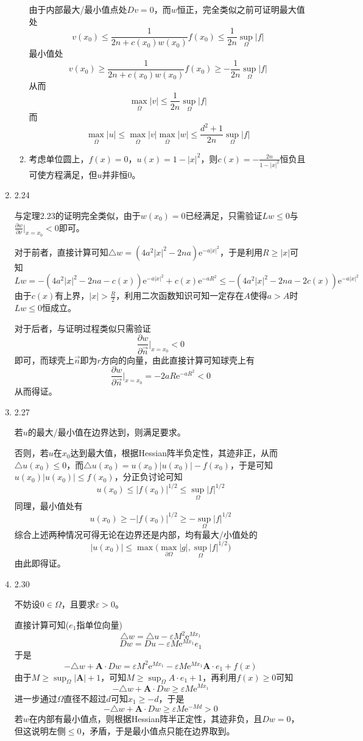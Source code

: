 \documentclass[a4paper,UTF8,fontset=windows,10pt]{ctexart}
\newcommand*{\er}{\mathrm{e}}
\begin{document}
\begin{enumerate}
\begin{enumerate}[(1)]
        由于内部最大/最小值点处$Dv=0$，而$w$恒正，完全类似之前可证明最大值处
        $$v(x_0)\le\frac{1}{2n+c(x_0)w(x_0)}f(x_0)\le\frac{1}{2n}\sup_\Omega|f|$$
        最小值处
        $$v(x_0)\ge\frac{1}{2n+c(x_0)w(x_0)}f(x_0)\ge-\frac{1}{2n}\sup_\Omega|f|$$
        从而
        $$\max_{\bar\Omega}|v|\le\frac{1}{2n}\sup_\Omega|f|$$
        而
        $$\max_{\bar\Omega}|u|\le\max_{\bar\Omega}|v|\max_{\bar\Omega}|w|\le\frac{d^2+1}{2n}\sup_\Omega|f|$$
    
        \item 考虑单位圆上，$f(x)=0$，$u(x)=1-|x|^2$，则$c(x)=-\frac{2n}{1-|x|^2}$恒负且可使方程满足，但$u$并非恒0。
    \end{enumerate}
    
    \item 2.24
    
    与定理2.23的证明完全类似，由于$w(x_0)=0$已经满足，只需验证$Lw\le0$与$\frac{\partial w}{\partial\nu}\big|_{x=x_0}<0$即可。
    
    对于前者，直接计算可知$\triangle w=(4a^2|x|^2-2na)\er^{-a|x|^2}$，于是利用$R\ge|x|$可知
    $$Lw=-(4a^2|x|^2-2na-c(x))\er^{-a|x|^2}+c(x)\er^{-aR^2}\le-(4a^2|x|^2-2na-2c(x))\er^{-a|x|^2}$$
    由于$c(x)$有上界，$|x|>\frac{R}{2}$，利用二次函数知识可知一定存在$A$使得$a>A$时$Lw\le0$恒成立。
    
    对于后者，与证明过程类似只需验证
    $$\frac{\partial w}{\partial\vec{n}}\bigg|_{x=x_0}<0$$
    即可，而球壳上$\vec{n}$即为$r$方向的向量，由此直接计算可知球壳上有
    $$\frac{\partial w}{\partial\vec{n}}\bigg|_{x=x_0}=-2aR\er^{-aR^2}<0$$
    从而得证。
    
    
    \item 2.27
    
    若$u$的最大/最小值在边界达到，则满足要求。
    
    否则，若$u$在$x_0$达到最大值，根据Hessian阵半负定性，其迹非正，从而$\triangle u(x_0)\le 0$，而$\triangle u(x_0)=u(x_0)|u(x_0)|-f(x_0)$，于是可知$u(x_0)|u(x_0)|\le f(x_0)$，分正负讨论可知
    $$u(x_0)\le|f(x_0)|^{1/2}\le\sup_\Omega|f|^{1/2}$$
    同理，最小值处有
    $$u(x_0)\ge-|f(x_0)|^{1/2}\ge-\sup_\Omega|f|^{1/2}$$
    综合上述两种情况可得无论在边界还是内部，均有最大/小值处的
    $$|u(x_0)|\le\max\bigg(\max_{\partial\Omega}|g|,\sup_\Omega|f|^{1/2}\bigg)$$
    由此即得证。
    
    \item 2.30
    
    不妨设$0\in\Omega$，且要求$\varepsilon>0$。
    
    直接计算可知($e_1$指单位向量)
    $$\triangle w=\triangle u-\varepsilon M^2\er^{Mx_1}$$
    $$Dw=Du-\varepsilon M\er^{Mx_1}e_1$$
    于是
    $$-\triangle w+\mathbf{A}\cdot Dw=\varepsilon M^2\er^{Mx_1}-\varepsilon M\er^{Mx_1}\mathbf{A}\cdot e_1+f(x)$$
    由于$M\ge\sup_\Omega|\mathbf{A}|+1$，可知$M\ge\sup_\Omega A\cdot e_1+1$，再利用$f(x)\ge0$可知
    $$-\triangle w+\mathbf{A}\cdot Dw\ge\varepsilon M\er^{Mx_1}$$
    进一步通过$\Omega$直径不超过$d$可知$x_1\ge -d$，于是
    $$-\triangle w+\mathbf{A}\cdot Dw\ge\varepsilon M\er^{-Md}>0$$
    若$w$在内部有最小值点，则根据Hessian阵半正定性，其迹非负，且$Dw=0$，但这说明左侧$\le0$，矛盾，于是最小值点只能在边界取到。
    

\end{enumerate}
\end{document}

